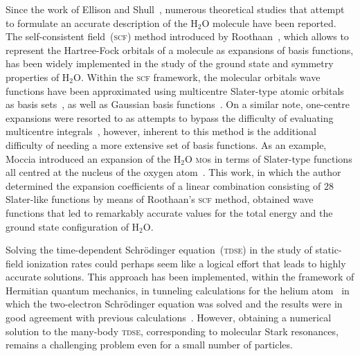 

Since the work of Ellison and Shull~\cite{EllisonShullh2o_1955},
numerous theoretical studies that attempt to formulate an accurate
description of the H$_{2}$O molecule have been reported. The
self-consistent field~(\textsc{scf}) method introduced by
Roothaan~\cite{Roothaan_1951}, which allows to represent the
Hartree-Fock orbitals of a molecule as expansions of basis functions,
has been widely implemented in the study of the ground state and
symmetry properties of H$_{2}$O. Within the \textsc{scf} framework,
the molecular orbitals wave functions have been approximated using
multicentre Slater-type atomic orbitals as basis
sets~\cite{Reeves_nature_1956,natureH2O_1960,Pitzer_1968,Pitzer_1970},
as well as Gaussian basis
functions~\cite{gaussianH2O_1965,Neumann_gaussian_1968}. On a similar
note, one-centre expansions were resorted to as attempts to bypass the
difficulty of evaluating multicentre
integrals~\cite{Moccia_1964,oneCentre_1961,Parr_JCP_1960}, however,
inherent to this method is the additional difficulty of needing a more
extensive set of basis functions. As an example, Moccia introduced an
expansion of the H$_{2}$O \textsc{mo}s in terms of Slater-type
functions all centred at the nucleus of the oxygen
atom~\cite{Moccia_1964}. This work, in which the author determined the
expansion coefficients of a linear combination consisting of $28$
Slater-like functions by means of Roothaan's \textsc{scf} method,
obtained wave functions that led to remarkably accurate values for the
total energy and the ground state configuration of H$_{2}$O.


Solving the time-dependent Schr\"{o}dinger equation~(\textsc{tdse}) in
the study of static-field ionization rates could perhaps seem like a
logical effort that leads to highly accurate solutions. This approach
has been implemented, within the framework of Hermitian quantum
mechanics, in tunneling calculations for the helium
atom~\cite{static_tdse_He,static_tdse_He_method} in which the
two-electron Schr\"{o}dinger equation was solved and the results were
in good agreement with previous
calculations~\cite{static_He_scrinzi}. However, obtaining a numerical
solution to the many-body \textsc{tdse}, corresponding to molecular
Stark resonances, remains a challenging problem even for a small
number of particles.

